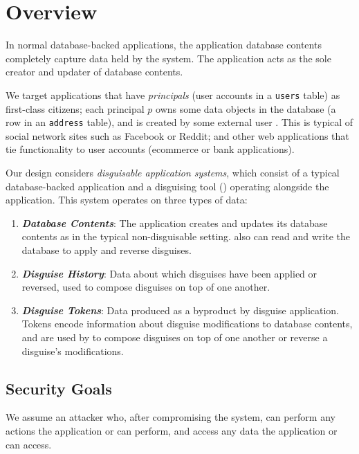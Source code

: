 \section{Overview}
In normal database-backed applications, the application database contents completely capture data
held by the system. The application acts as the sole creator and updater of database contents. 

We target applications that have \emph{principals} (\ie user accounts in a \texttt{users} table) as
first-class citizens; each principal $p$ owns some data objects in the database (\eg a row in an
\texttt{address} table), and is created by some external user .
%
This is typical of social network sites such as Facebook or Reddit; and other web applications that
tie functionality to user accounts (\eg ecommerce or bank applications).

Our design considers \emph{disguisable application systems}, which consist of a typical database-backed
application and a disguising tool (\sys) operating alongside the application. This system operates
on three types of data:
\begin{enumerate}
    \item \emph{\textbf{Database Contents}}: The application creates and updates its database
        contents as in the typical non-disguisable setting. \sys also can read and write
        the database to apply and reverse disguises.
    \item \emph{\textbf{Disguise History}}: Data about which disguises have been applied or
        reversed, used to compose disguises on top of one another.
    \item \emph{\textbf{Disguise Tokens}}: Data produced as a byproduct by disguise application.
        Tokens encode information about disguise modifications to database contents, and are used by
        \sys to compose disguises on top of one another or reverse a disguise's modifications.
\end{enumerate}

\subsection{Security Goals}
We assume an attacker who, after compromising the system, can perform any actions the
application or \sys can perform, and access any data the application or \sys can access.


